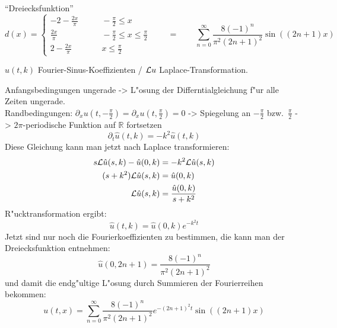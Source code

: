 ``Dreiecksfunktion''
\[
d(x)
=
\begin{cases}
\displaystyle-2-\frac{2x}{\pi}&\qquad \displaystyle-\frac{\pi}2\le x\\
\displaystyle\frac{2x}{\pi}&\qquad \displaystyle-\frac{\pi}2\le x\le \frac{\pi}2\\
\displaystyle2-\frac{2x}{\pi}&\qquad \displaystyle x\le\frac{\pi}2
\end{cases}
 \qquad = \qquad \sum_{n=0}^\infty \frac{8(-1)^n}{\pi^2(2n+1)^2}\sin ((2n+1)x)
\]

 $\hat u(t,k)$ Fourier-Sinus-Koeffizienten / ${\cal L} u$ Laplace-Transformation.

Anfangsbedingungen ungerade -> L"osung der
Differntialgleichung f"ur alle Zeiten ungerade. \\
Randbedingungen:
$\partial_xu(t,-\frac{\pi}2)=\partial_xu(t,\frac{\pi}2)=0$
-> Spiegelung an
$-\frac{\pi}2$ bzw.~$\frac{\pi}2$ -> $2\pi$-periodische
Funktion auf $\mathbb R$ fortsetzen 
\[
\partial_t\hat u(t,k)=-k^2\hat u(t,k)
\]
Diese Gleichung kann man jetzt nach Laplace transformieren:
\begin{align*}
s{\cal L}\hat u(s,k) - \hat u(0,k)&=-k^2 {\cal L}\hat u(s,k)\\
(s+k^2){\cal L}\hat u(s,k)&=\hat u(0,k)\\
{\cal L}\hat u(s,k)&=\frac{\hat u(0,k)}{s+k^2}
\end{align*}
R"ucktransformation ergibt:
\[
\hat u(t,k)=\hat u(0,k) e^{-k^2t}
\]
Jetzt sind nur noch die Fourierkoeffizienten zu bestimmen, die kann
man der Dreiecksfunktion entnehmen:
\[
\hat u(0,2n+1)=
\frac{8(-1)^n}{\pi^2(2n+1)^2}
\]
und damit die endg"ultige L"osung durch Summieren der Fourierreihen bekommen:
\[
u(t,x)=
\sum_{n=0}^\infty \frac{8(-1)^n}{\pi^2(2n+1)^2}e^{-(2n+1)^2t}\sin((2n+1)x)
\]






